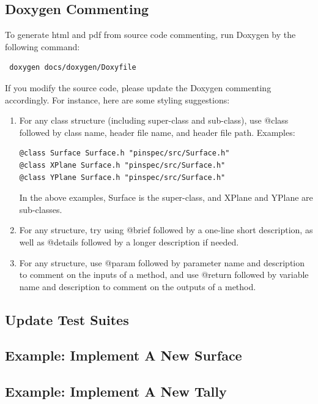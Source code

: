 \documentclass[titlepage]{article}
\begin{document}
\subsection{Doxygen Commenting} \label{doxygen}
To generate html and pdf from source code commenting, run Doxygen by the following command:
\begin{verbatim}
 doxygen docs/doxygen/Doxyfile
\end{verbatim}

If you modify the source code, please update the Doxygen commenting accordingly. For instance, here are some styling suggestions:
\begin{enumerate}
\item For any class structure (including super-class and sub-class), use @class followed by class name, header file name, and header file path. Examples:
\begin{verbatim}
@class Surface Surface.h "pinspec/src/Surface.h"
@class XPlane Surface.h "pinspec/src/Surface.h"
@class YPlane Surface.h "pinspec/src/Surface.h"
\end{verbatim}
In the above examples, Surface is the super-class, and XPlane and YPlane are sub-classes. 

\item For any structure, try using @brief followed by a one-line short description, as well as @details followed by a longer description if needed. 

\item For any structure, use @param followed by parameter name and description to comment on the inputs of a method, and use @return followed by variable name and description to comment on the outputs of a method. 
\end{enumerate}


\clearpage
\subsection{Update Test Suites}

\clearpage
\subsection{Example: Implement A New Surface}

\clearpage
\subsection{Example: Implement A New Tally}


\clearpage
\end{document}
